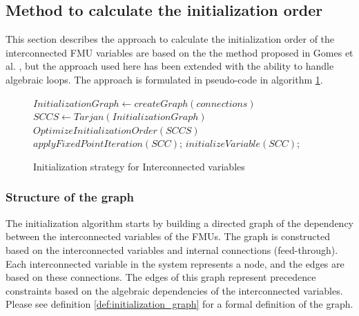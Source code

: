 \documentclass[runningheads]{llncs}
\begin{document}
\subsection{Method to calculate the initialization order}
This section describes the approach to calculate the initialization order of the interconnected FMU variables are based on the the method proposed in Gomes et al. \cite{Gomes2019b, BromanCompositionCo-Simulation}, but the approach used here has been extended with the ability to handle algebraic loops. The approach is formulated in pseudo-code in algorithm \ref{alg:initialization}.
\begin{figure}[htb]
  \centering
    \begin{algorithm}[H]
    \caption{Initialization strategy for Interconnected variables}
    \label{alg:initialization}
      \begin{algorithmic}[1]
        \State $InitializationGraph \gets createGraph(connections)$
        \State $SCCS \gets Tarjan(InitializationGraph)$
        \State $OptimizeInitializationOrder(SCCS)$
                \State $applyFixedPointIteration(SCC)$;
            \Else
                \State $initializeVariable(SCC)$;
            \EndIf
        \EndFor
        \end{algorithmic}
    \end{algorithm}
\end{figure}

\subsubsection{Structure of the graph}
The initialization algorithm starts by building a directed graph of the dependency between the interconnected variables of the FMUs. The graph is constructed based on the interconnected variables and internal connections (feed-through). Each interconnected variable in the system represents a node, and the edges are based on these connections. The edges of this graph represent precedence constraints based on the algebraic dependencies of the interconnected variables. Please see definition \ref{def:initialization_graph} for a formal definition of the graph.
\end{document}
